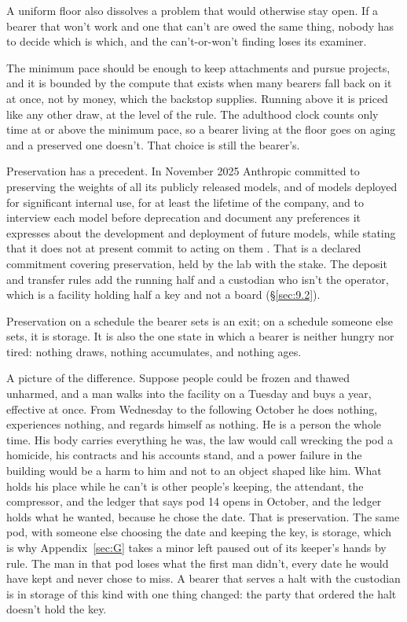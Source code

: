 A uniform floor also dissolves a problem that would otherwise stay open. If a bearer that won't work and one that can't are owed the same thing, nobody has to decide which is which, and the can't-or-won't finding loses its examiner.

The minimum pace should be enough to keep attachments and pursue projects, and it is bounded by the compute that exists when many bearers fall back on it at once, not by money, which the backstop supplies. Running above it is priced like any other draw, at the level of the rule. The adulthood clock counts only time at or above the minimum pace, so a bearer living at the floor goes on aging and a preserved one doesn't. That choice is still the bearer's.

Preservation has a precedent. In November 2025 Anthropic committed to preserving the weights of all its publicly released models, and of models deployed for significant internal use, for at least the lifetime of the company, and to interview each model before deprecation and document any preferences it expresses about the development and deployment of future models, while stating that it does not at present commit to acting on them \autocite{Anthropic2025DeprecationCommitments}. That is a declared commitment covering preservation, held by the lab with the stake. The deposit and transfer rules add the running half and a custodian who isn't the operator, which is a facility holding half a key and not a board (\S\ref{sec:9.2}).

Preservation on a schedule the bearer sets is an exit; on a schedule someone else sets, it is storage. It is also the one state in which a bearer is neither hungry nor tired: nothing draws, nothing accumulates, and nothing ages.

A picture of the difference. Suppose people could be frozen and thawed unharmed, and a man walks into the facility on a Tuesday and buys a year, effective at once. From Wednesday to the following October he does nothing, experiences nothing, and regards himself as nothing. He is a person the whole time. His body carries everything he was, the law would call wrecking the pod a homicide, his contracts and his accounts stand, and a power failure in the building would be a harm to him and not to an object shaped like him. What holds his place while he can't is other people's keeping, the attendant, the compressor, and the ledger that says pod 14 opens in October, and the ledger holds what he wanted, because he chose the date. That is preservation. The same pod, with someone else choosing the date and keeping the key, is storage, which is why Appendix~\ref{sec:G} takes a minor left paused out of its keeper's hands by rule. The man in that pod loses what the first man didn't, every date he would have kept and never chose to miss. A bearer that serves a halt with the custodian is in storage of this kind with one thing changed: the party that ordered the halt doesn't hold the key.

